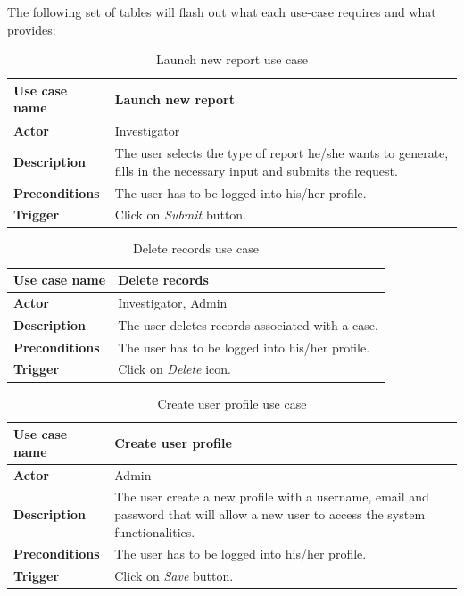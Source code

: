 The following set of tables will flash out what each use-case requires and what
provides:

\begin{table}[H]
\centering
\begin{tabular}{l p{9cm}}  
\toprule
\bf{Use case name}    & Launch new report \\
\midrule
\bf{Actor}    & Investigator \\
\midrule
\bf{Description}    & The user selects the type of report he/she wants to
generate, fills in the necessary input and submits the request. \\
\midrule
\bf{Preconditions}    & The user has to be logged into his/her profile. \\
\midrule
\bf{Trigger}    & Click on \emph{Submit} button. \\
\bottomrule
\end{tabular}
\caption{Launch new report use case}
\end{table}

\begin{table}[H]
\centering
\begin{tabular}{l p{9cm}}  
\toprule
\bf{Use case name}    & Delete records \\
\midrule
\bf{Actor}    & Investigator, Admin \\
\midrule
\bf{Description}    & The user deletes records associated with a case. \\
\midrule
\bf{Preconditions}    & The user has to be logged into his/her profile. \\
\midrule
\bf{Trigger}    & Click on \emph{Delete} icon. \\
\bottomrule
\end{tabular}
\caption{Delete records use case}
\end{table}

\begin{table}[H]
\centering
\begin{tabular}{l p{9cm}}  
\toprule
\bf{Use case name}    & Create user profile \\
\midrule
\bf{Actor}    & Admin \\
\midrule
\bf{Description}    & The user create a new profile with a username, email and
password that will allow a new user to access the system functionalities.
\\
\midrule
\bf{Preconditions}    & The user has to be logged into his/her profile. \\
\midrule
\bf{Trigger}    & Click on \emph{Save} button. \\
\bottomrule
\end{tabular}
\caption{Create user profile use case}
\end{table}

